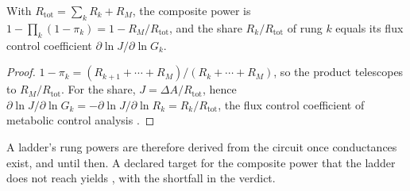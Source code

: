 \begin{proposition}
\label{prop:ladder}
With $R_{\mathrm{tot}}=\sum_k R_k + R_M$, the composite power is $1-\prod_k(1-\pi_k) = 1-R_M/R_{\mathrm{tot}}$, and the share $R_k/R_{\mathrm{tot}}$ of rung $k$ equals its flux control coefficient $\partial\ln J/\partial\ln G_k$.
\end{proposition}
\begin{proof}
$1-\pi_k=(R_{k+1}+\cdots+R_M)/(R_k+\cdots+R_M)$, so the product telescopes to $R_M/R_{\mathrm{tot}}$.
For the share, $J=\Delta A/R_{\mathrm{tot}}$, hence $\partial\ln J/\partial\ln G_k = -\partial\ln J/\partial\ln R_k = R_k/R_{\mathrm{tot}}$, the flux control coefficient of metabolic control analysis \citep{kacser1973control,heinrich1974linear}.
\end{proof}

A ladder's rung powers are therefore derived from the circuit once conductances exist, and  until then.
A declared target for the composite power that the ladder does not reach yields , with the shortfall in the verdict.
